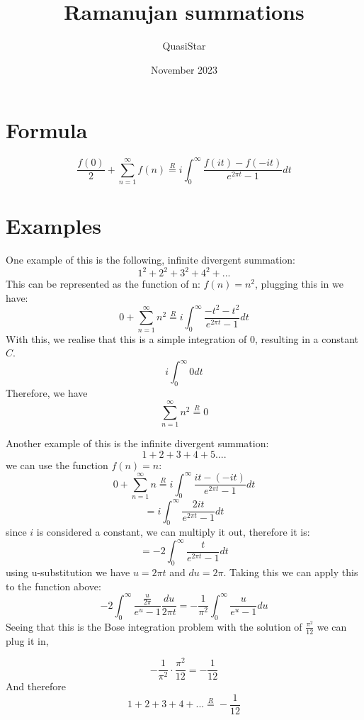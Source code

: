\documentclass{article}
\title{Ramanujan summations}
\author{QuasiStar}
\date{November 2023}
\begin{document}
\maketitle
\section{Formula}

$$\frac{f\left(0\right)}{2}+\sum_{n=1}^{\infty}f\left(n\right) \stackrel{R}{=} i\int_{0}^{\infty}\frac{f\left(it\right)-f\left(-it\right)}{e^{2\pi t}-1}dt$$

\section{Examples}
One example of this is the following, infinite divergent summation:
$$1^{2}+2^{2}+3^{2}+4^{2}+...$$
This can be represented as the function of n: $f(n)=n^{2}$, plugging this in we have:
$$0+\sum_{n=1}^{\infty}n^{2} \stackrel{R}{=} i\int_{0}^{\infty}\frac{-t^{2}-t^{2}}{e^{2\pi t}-1}dt$$
With this, we realise that this is a simple integration of 0, resulting in a constant $C$.
$$i\int_{0}^{\infty}0dt$$
Therefore, we have 
$$\sum_{n=1}^{\infty}n^{2} \stackrel{R}{=} 0$$


Another example of this is the infinite divergent summation:
$$1+2+3+4+5....$$
we can use the function $f(n)=n$:
$$0+\sum_{n=1}^{\infty}n \stackrel{R}{=}  i\int_{0}^{\infty}\frac{it-(-it)}{e^{2\pi t}-1}dt$$
$$=  i\int_{0}^{\infty}\frac{2it}{e^{2\pi t}-1}dt$$
since $i$ is considered a constant, we can multiply it out, therefore it is:
$$=  -2\int_{0}^{\infty}\frac{t}{e^{2\pi t}-1}dt$$
using u-substitution we have $u=2\pi t$ and $du=2\pi$. Taking this we can apply this to the function above:
$$-2\int_{0}^{\infty}\frac{\frac{u}{2\pi}}{e^{u}-1}\frac{du}{2\pi t} = -\frac{1}{\pi^{2}}\int_{0}^{\infty}\frac{u}{e^{u}-1}du$$
Seeing that this is the Bose integration problem with the solution of $\frac{\pi^{2}}{12}$ we can plug it in,

$$-\frac{1}{\pi^{2}}\cdot\frac{\pi^{2}}{12}=-\frac{1}{12}$$
And therefore 
$$1+2+3+4+...\stackrel{R}{=} -\frac{1}{12}$$
\end{document}
